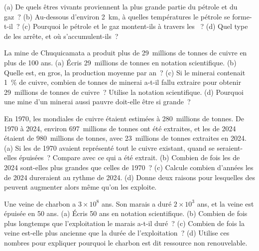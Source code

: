 \begin{exercise}[$\star\star$]\label{exo:g9:earth-resources:9}
(a) De quels êtres vivants proviennent la plus grande partie du pétrole et
du gaz~? (b) Au-dessous d'environ \qty{2}{km}, à quelles températures le
pétrole se forme-t-il~? (c) Pourquoi le pétrole et le gaz montent-ils à
travers les ~? (d) Quel type de  les arrête, et où
s'accumulent-ils~?
\end{exercise}

\begin{exercise}[$\star\star$]\label{exo:g9:earth-resources:10}
La mine de Chuquicamata a produit plus de 29~millions de tonnes de cuivre
en plus de 100 ans. (a) Écris 29~millions de tonnes en notation
scientifique. (b) Quelle est, en gros, la production moyenne par an~?
(c) Si le minerai contenait \qty{1}{\%} de cuivre, combien de tonnes de
minerai a-t-il fallu extraire pour obtenir 29~millions de tonnes de
cuivre~? Utilise la notation scientifique. (d) Pourquoi une mine d'un
minerai aussi pauvre doit-elle être si grande~?
\end{exercise}

\begin{exercise}[$\star\star\star$]\label{exo:g9:earth-resources:11}
En 1970, les  mondiales de cuivre étaient estimées à 280~millions
de tonnes. De 1970 à 2024, environ 697~millions de tonnes ont été extraites,
et les  de 2024 étaient de 980~millions de tonnes, avec
23~millions de tonnes extraites en 2024. (a) Si les  de 1970
avaient représenté tout le cuivre existant, quand se seraient-elles
épuisées~? Compare avec ce qui a été extrait. (b) Combien de fois les
 de 2024 sont-elles plus grandes que celles de 1970~? (c) Calcule
combien d'années les  de 2024 dureraient au rythme de 2024.
(d) Donne deux raisons pour lesquelles des  peuvent augmenter alors
même qu'on les exploite.
\end{exercise}

\begin{exercise}[$\star\star\star$]\label{exo:g9:earth-resources:12}
Une veine de charbon a $3 \times 10^8$ ans. Son marais a duré $2 \times 10^3$
ans, et la veine est épuisée en 50 ans. (a) Écris 50 ans en notation
scientifique. (b) Combien de fois plus longtemps que l'exploitation le
marais a-t-il duré~? (c) Combien de fois la veine est-elle plus ancienne
que la durée de l'exploitation~? (d) Utilise ces nombres pour expliquer
pourquoi le charbon est dit ressource non renouvelable.
\end{exercise}

